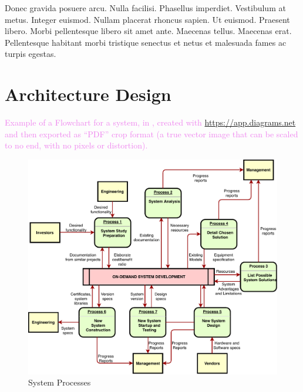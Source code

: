 \cleardoublepage
\label{chap:architecture}

Donec gravida posuere arcu. Nulla facilisi. Phasellus imperdiet. Vestibulum at metus. Integer euismod. Nullam placerat rhoncus sapien. Ut euismod. Praesent libero. Morbi pellentesque libero sit amet ante. Maecenas tellus. Maecenas erat. Pellentesque habitant morbi tristique senectus et netus et malesuada fames ac turpis egestas.
\section{Architecture Design} 
\textcolor{violet}{Example of a Flowchart for a system, in , created with \url{https://app.diagrams.net} and then exported as ``PDF'' crop format (a true vector image that can be scaled to no end, with no pixels or distortion).}

\begin{figure}[h]
\centering
\includegraphics[width=1.0\textwidth]{./Images/Flowchart_from_draw-io.pdf}
\caption{System Processes}
\label{fig:flowchart}
\end{figure}

